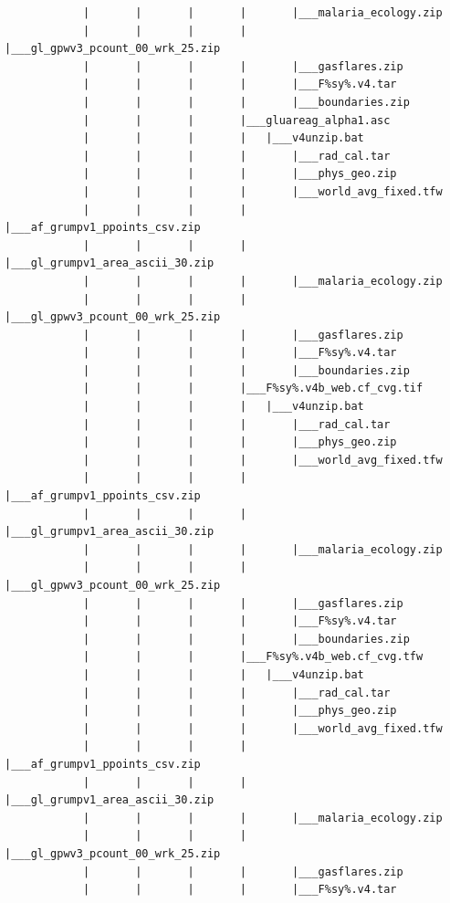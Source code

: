 \documentclass[]{book}
\begin{document}
\begin{verbatim}
            |       |       |       |       |___malaria_ecology.zip
            |       |       |       |       |___gl_gpwv3_pcount_00_wrk_25.zip
            |       |       |       |       |___gasflares.zip
            |       |       |       |       |___F%sy%.v4.tar
            |       |       |       |       |___boundaries.zip
            |       |       |       |___gluareag_alpha1.asc
            |       |       |       |   |___v4unzip.bat
            |       |       |       |       |___rad_cal.tar
            |       |       |       |       |___phys_geo.zip
            |       |       |       |       |___world_avg_fixed.tfw
            |       |       |       |       |___af_grumpv1_ppoints_csv.zip
            |       |       |       |       |___gl_grumpv1_area_ascii_30.zip
            |       |       |       |       |___malaria_ecology.zip
            |       |       |       |       |___gl_gpwv3_pcount_00_wrk_25.zip
            |       |       |       |       |___gasflares.zip
            |       |       |       |       |___F%sy%.v4.tar
            |       |       |       |       |___boundaries.zip
            |       |       |       |___F%sy%.v4b_web.cf_cvg.tif
            |       |       |       |   |___v4unzip.bat
            |       |       |       |       |___rad_cal.tar
            |       |       |       |       |___phys_geo.zip
            |       |       |       |       |___world_avg_fixed.tfw
            |       |       |       |       |___af_grumpv1_ppoints_csv.zip
            |       |       |       |       |___gl_grumpv1_area_ascii_30.zip
            |       |       |       |       |___malaria_ecology.zip
            |       |       |       |       |___gl_gpwv3_pcount_00_wrk_25.zip
            |       |       |       |       |___gasflares.zip
            |       |       |       |       |___F%sy%.v4.tar
            |       |       |       |       |___boundaries.zip
            |       |       |       |___F%sy%.v4b_web.cf_cvg.tfw
            |       |       |       |   |___v4unzip.bat
            |       |       |       |       |___rad_cal.tar
            |       |       |       |       |___phys_geo.zip
            |       |       |       |       |___world_avg_fixed.tfw
            |       |       |       |       |___af_grumpv1_ppoints_csv.zip
            |       |       |       |       |___gl_grumpv1_area_ascii_30.zip
            |       |       |       |       |___malaria_ecology.zip
            |       |       |       |       |___gl_gpwv3_pcount_00_wrk_25.zip
            |       |       |       |       |___gasflares.zip
            |       |       |       |       |___F%sy%.v4.tar

\end{verbatim}
\end{document}
